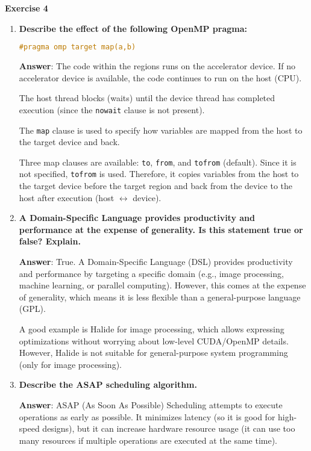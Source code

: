 \begin{flushleft}
    \textcolor{Green3}{ \textbf{Exercise 4}}
\end{flushleft}
\begin{enumerate}[label=\Alph*.]
    \item \textcolor{Green3}{\textbf{%
        Describe the effect of the following OpenMP pragma:
    }}
    \begin{lstlisting}[language=c++]
#pragma omp target map(a,b)\end{lstlisting}

    \textbf{Answer}: The code within the regions runs on the accelerator device. If no accelerator device is available, the code continues to run on the host (CPU).

    The host thread blocks (waits) until the device thread has completed execution (since the \texttt{nowait} clause is not present).

    The \texttt{map} clause is used to specify how variables are mapped from the host to the target device and back.

    Three map clauses are available: \texttt{to}, \texttt{from}, and \texttt{tofrom} (default). Since it is not specified, \texttt{tofrom} is used. Therefore, it copies variables from the host to the target device before the target region and back from the device to the host after execution (host $\leftrightarrow$ device).

    \item \textcolor{Green3}{\textbf{%
        A Domain-Specific Language provides productivity and performance at the expense of generality. Is this statement true or false? Explain.
    }}

    \textbf{Answer}: True. A Domain-Specific Language (DSL) provides productivity and performance by targeting a specific domain (e.g., image processing, machine learning, or parallel computing). However, this comes at the expense of generality, which means it is less flexible than a general-purpose language (GPL).

    A good example is Halide for image processing, which allows expressing optimizations without worrying about low-level CUDA/OpenMP details. However, Halide is not suitable for general-purpose system programming (only for image processing).

    \item \textcolor{Green3}{\textbf{%
        Describe the ASAP scheduling algorithm.
    }}

    \textbf{Answer}: ASAP (As Soon As Possible) Scheduling attempts to execute operations as early as possible. It minimizes latency (so it is good for high-speed designs), but it can increase hardware resource usage (it can use too many resources if multiple operations are executed at the same time).
\end{enumerate}